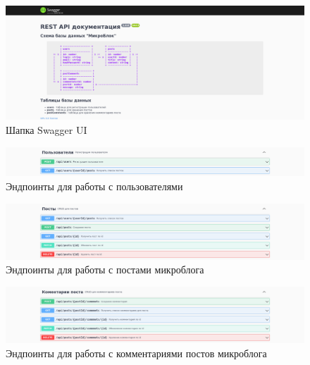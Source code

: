 \documentclass[12pt, a4paper, simple]{eskdtext}
\begin{document}
  \begin{figure}[!h]
    \centering
    \includegraphics[width=18cm]
    {images/SwaggerUi/2023-02-25_17-57-46.png}
    \caption{Шапка Swagger UI}
    \label{fig:swaggerui_1}
  \end{figure}

  \begin{figure}[!h]
    \centering
    \includegraphics[width=18cm]
    {images/SwaggerUi/2023-02-25_18-02-00.png}
    \caption{Эндпоинты для работы с пользователями}
    \label{fig:swaggerui_2}
  \end{figure}

  \begin{figure}[!h]
    \centering
    \includegraphics[width=18cm]
    {images/SwaggerUi/2023-02-25_18-03-10.png}
    \caption{Эндпоинты для работы с постами микроблога}
    \label{fig:swaggerui_3}
  \end{figure}

  \begin{figure}[!h]
    \centering
    \includegraphics[width=18cm]
    {images/SwaggerUi/2023-02-25_18-04-41.png}
    \caption{Эндпоинты для работы с комментариями постов микроблога}
    \label{fig:swaggerui_4}
  \end{figure}
\end{document}

